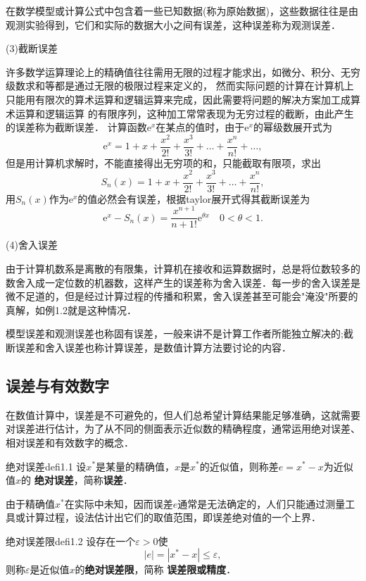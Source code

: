 在数学模型或计算公式中包含着一些已知数据(称为原始数据)，这些数据往往是由观测实验得到，它们和实际的数据大小之间有误差，这种误差称为观测误差．

(3)截断误差

许多数学运算理论上的精确值往往需用无限的过程才能求出，如微分、积分、无穷级数求和等都是通过无限的极限过程来定义的，
然而实际问题的计算在计算机上只能用有限次的算术运算和逻辑运算来完成，因此需要将问题的解决方案加工成算术运算和逻辑运算
的有限序列，这种加工常常表现为无穷过程的截断，由此产生的误差称为截断误差．
\exam 计算函数$\mathrm{e}^x$在某点的值时，由于$\mathrm{e}^x$的幂级数展开式为
\begin{equation}\label{equ1.3}
\mathrm{e}^x=1+x+\frac{x^2}{2!}+\frac{x^3}{3!}+\ldots+\frac{x^n}{n!}+\ldots,
\end{equation}
但是用计算机求解时，不能直接得出无穷项的和，只能截取有限项，求出
\begin{equation}\label{equ1.4}
S_n(x)=1+x+\frac{x^2}{2!}+\frac{x^3}{3!}+\ldots+\frac{x^n}{n!},
\end{equation}
用$S_n(x)$作为$\mathrm{e}^x$的值必然会有误差，根据taylor展开式得其截断误差为
\begin{equation}\label{equ1.5}
\mathrm{e}^x-S_n(x)=\frac{x^{n+1}}{{n+1}!}\mathrm{e}^{\theta x}\quad 0<\theta<1.
\end{equation}


(4)舍入误差

由于计算机数系是离散的有限集，计算机在接收和运算数据时，总是将位数较多的数舍入成一定位数的机器数，这样产生的误差称为舍入误差．每一步的舍入误差是微不足道的，但是经过计算过程的传播和积累，舍入误差甚至可能会"淹没"所要的真解，如例1.2就是这种情况．

模型误差和观测误差也称固有误差，一般来讲不是计算工作者所能独立解决的;截断误差和舍入误差也称计算误差，是数值计算方法要讨论的内容．
\subsection{误差与有效数字}
在数值计算中，误差是不可避免的，但人们总希望计算结果能足够准确，这就需要对误差进行估计，为了从不同的侧面表示近似数的精确程度，通常运用绝对误差、相对误差和有效数字的概念．
\begin{defi}{绝对误差}{defi1.1}
设$x^*$是某量的精确值，$x$是$x^*$的近似值，则称差$e=x^*-x$为近似值$x$的{\bf
绝对误差}，简称{\bf 误差}．
\end{defi}

由于精确值$x^*$在实际中未知，因而误差$e$通常是无法确定的，人们只能通过测量工具或计算过程，设法估计出它们的取值范围，即误差绝对值的一个上界．
\begin{defi}{绝对误差限}{defi1.2}
设存在一个$\varepsilon>0$使
\begin{equation}
\label{equ1.6}|e|=|x^*-x|\leqslant \varepsilon,
\end{equation}
则称$\varepsilon$是近似值$x$的{\bf 绝对误差限}，简称{\bf
误差限或精度}．
\end{defi}

